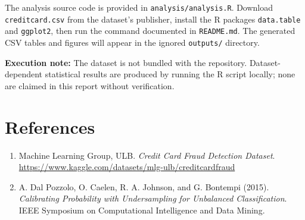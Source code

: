 \documentclass[11pt,a4paper]{article}
\begin{document}
The analysis source code is provided in \texttt{analysis/analysis.R}. Download \texttt{creditcard.csv} from the dataset's publisher, install the R packages \texttt{data.table} and \texttt{ggplot2}, then run the command documented in \texttt{README.md}. The generated CSV tables and figures will appear in the ignored \texttt{outputs/} directory.

\textbf{Execution note:} The dataset is not bundled with the repository. Dataset-dependent statistical results are produced by running the R script locally; none are claimed in this report without verification.

\section*{References}

\begin{enumerate}
  \item Machine Learning Group, ULB. \emph{Credit Card Fraud Detection Dataset}. \url{https://www.kaggle.com/datasets/mlg-ulb/creditcardfraud}
  \item A. Dal Pozzolo, O. Caelen, R. A. Johnson, and G. Bontempi (2015). \emph{Calibrating Probability with Undersampling for Unbalanced Classification}. IEEE Symposium on Computational Intelligence and Data Mining.
\end{enumerate}
\end{document}
